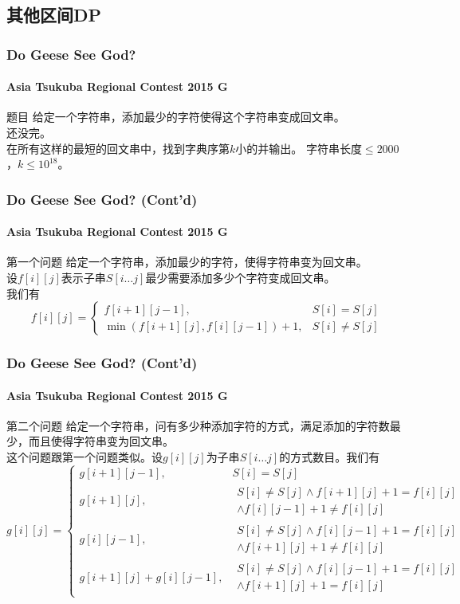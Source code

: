 \documentclass[hyperref={unicode=true}]{beamer}
\theoremstyle{definition}
\theoremstyle{proof}
\begin{document}
\subsection{其他区间DP}
\begin{frame}\frametitle{Do Geese See God?}
  \framesubtitle{Asia Tsukuba Regional Contest 2015 G}
  \begin{block}{题目}
    给定一个字符串，添加最少的字符使得这个字符串变成回文串。\\
    \pause{}还没完。\\
    在所有这样的最短的回文串中，找到字典序第$k$小的并输出。
    字符串长度$\leq 2000$，$k \leq 10^{18}$。
  \end{block}
\end{frame}
\begin{frame}\frametitle{Do Geese See God? (Cont'd)}
  \framesubtitle{Asia Tsukuba Regional Contest 2015 G}
  \begin{alertblock}{第一个问题}
    给定一个字符串，添加最少的字符，使得字符串变为回文串。\\
    \pause{}设$f[i][j]$表示子串$S[i\ldots j]$最少需要添加多少个字符变成回文串。\\
    我们有
\[f[i][j]=\begin{cases}
f[i+1][j-1], &S[i]=S[j]\\
\min{(f[i+1][j], f[i][j-1])} + 1, &S[i] \neq S[j]
\end{cases}\]
  \end{alertblock}
\end{frame}
\begin{frame}\frametitle{Do Geese See God? (Cont'd)}
  \framesubtitle{Asia Tsukuba Regional Contest 2015 G}
  \begin{alertblock}{第二个问题}
    给定一个字符串，问有多少种添加字符的方式，满足添加的字符数最少，而且使得字符串变为回文串。\\
    \pause{}这个问题跟第一个问题类似。设$g[i][j]$为子串$S[i \ldots j]$的方式数目。我们有
\[g[i][j]=\begin{cases}
g[i+1][j-1], &S[i] = S[j]\\
g[i+1][j], &\substack{S[i]\neq S[j] \wedge f[i+1][j]+1=f[i][j] \\\wedge f[i][j-1]+1\neq f[i][j]}\\
g[i][j-1], &\substack{S[i] \neq S[j] \wedge f[i][j-1]+1 = f[i][j] \\\wedge f[i+1][j]+1 \neq f[i][j]}\\
g[i+1][j] + g[i][j-1], &\substack{S[i] \neq S[j] \wedge f[i][j-1]+1 = f[i][j] \\\wedge f[i+1][j] +1=f[i][j]}
\end{cases}\]
  \end{alertblock}
\end{frame}
\end{document}
